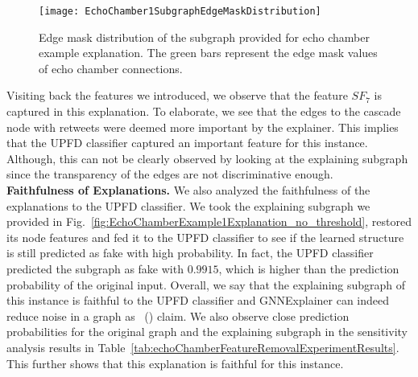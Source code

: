 \begin{figure}
    \centering
    \texttt{[image: EchoChamber1SubgraphEdgeMaskDistribution]}
    \caption[Edge mask distribution of the subgraph provided for echo chamber example explanation.]{Edge mask distribution of the subgraph provided for echo chamber example explanation. The green bars represent the edge mask values of echo chamber connections.}
    \label{fig:EchoChamber1SubgraphEdgeMaskDistribution}
\end{figure}
Visiting back the features we introduced, we observe that the feature $SF_7$ is captured in this explanation. To elaborate, we see that the edges to the cascade node with retweets were deemed more important by the explainer. This implies that the UPFD classifier captured an important feature for this instance. Although, this can not be clearly observed by looking at the explaining subgraph since the transparency of the edges are not discriminative enough.\\
\textbf{Faithfulness of Explanations.} We also analyzed the faithfulness of the explanations to the UPFD classifier. We took the explaining subgraph we provided in Fig.~\ref{fig:EchoChamberExample1Explanation_no_threshold}, restored its node features and fed it to the UPFD classifier to see if the learned structure is still predicted as fake with high probability. In fact, the UPFD classifier predicted the subgraph as fake with $0.9915$, which is higher than the prediction probability of the original input. Overall, we say that the explaining subgraph of this instance is faithful to the UPFD classifier and GNNExplainer can indeed reduce noise in a graph as~\citeauthor{GNNExplainer_Ying} (\citeyear{GNNExplainer_Ying}) claim. We also observe close prediction probabilities for the original graph and the explaining subgraph in the sensitivity analysis results in Table~\ref{tab:echoChamberFeatureRemovalExperimentResults}. This further shows that this explanation is faithful for this instance.\\
